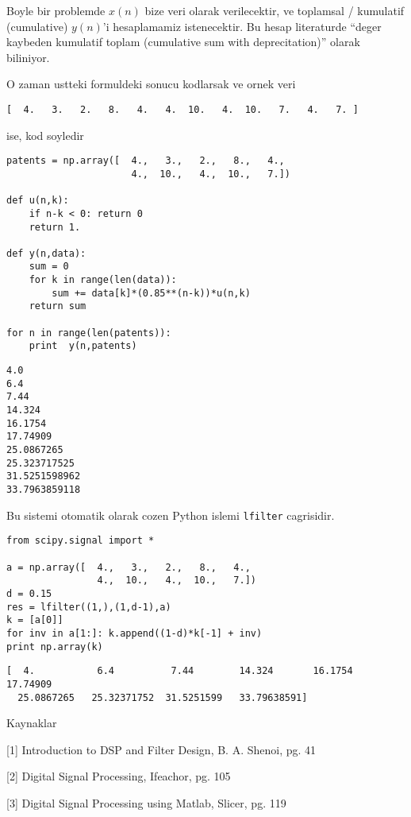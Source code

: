 \documentclass[12pt,fleqn]{article}\usepackage{../common}
\begin{document}
Boyle bir problemde $x(n)$ bize veri olarak verilecektir, ve toplamsal /
kumulatif (cumulative) $y(n)$'i hesaplamamiz istenecektir. Bu hesap
literaturde ``deger kaybeden kumulatif toplam (cumulative sum with
deprecitation)'' olarak biliniyor.

O zaman ustteki formuldeki sonucu kodlarsak ve ornek veri

\verb![  4.   3.   2.   8.   4.   4.  10.   4.  10.   7.   4.   7. ]!

ise, kod soyledir

\begin{verbatim}
patents = np.array([  4.,   3.,   2.,   8.,   4.,  
                      4.,  10.,   4.,  10.,   7.])

def u(n,k):
    if n-k < 0: return 0
    return 1.

def y(n,data):
    sum = 0
    for k in range(len(data)):
        sum += data[k]*(0.85**(n-k))*u(n,k)
    return sum

for n in range(len(patents)):    
    print  y(n,patents)
\end{verbatim}

\begin{verbatim}
4.0
6.4
7.44
14.324
16.1754
17.74909
25.0867265
25.323717525
31.5251598962
33.7963859118
\end{verbatim}

Bu sistemi otomatik olarak cozen Python islemi \verb!lfilter!
cagrisidir.

\begin{verbatim}
from scipy.signal import *

a = np.array([  4.,   3.,   2.,   8.,   4.,  
                4.,  10.,   4.,  10.,   7.])
d = 0.15 
res = lfilter((1,),(1,d-1),a) 
k = [a[0]] 
for inv in a[1:]: k.append((1-d)*k[-1] + inv) 
print np.array(k) 
\end{verbatim}

\begin{verbatim}
[  4.           6.4          7.44        14.324       16.1754      17.74909
  25.0867265   25.32371752  31.5251599   33.79638591]
\end{verbatim}

Kaynaklar

[1] Introduction to DSP and Filter Design, B. A. Shenoi, pg. 41

[2] Digital Signal Processing, Ifeachor, pg. 105

[3] Digital Signal Processing using Matlab, Slicer, pg. 119
\end{document}
